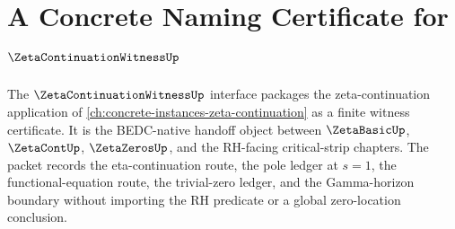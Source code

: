 \chapter{A Concrete Naming Certificate for $\ZetaContinuationWitnessUp$}
\label{ch:concrete-instances-zeta-continuation-witness-namecert}

The $\ZetaContinuationWitnessUp$ interface packages the zeta-continuation application of \autoref{ch:concrete-instances-zeta-continuation} as a finite witness certificate. It is the BEDC-native handoff object between $\ZetaBasicUp$, $\ZetaContUp$, $\ZetaZerosUp$, and the RH-facing critical-strip chapters. The packet records the eta-continuation route, the pole ledger at $s=1$, the functional-equation route, the trivial-zero ledger, and the Gamma-horizon boundary without importing the RH predicate or a global zero-location conclusion.

